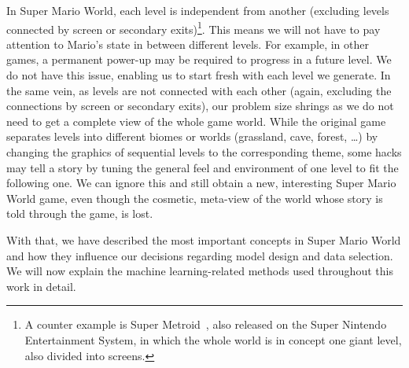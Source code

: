 In Super Mario World, each level is independent from another
(excluding levels connected by screen or secondary exits)\footnote{A
  counter example is Super Metroid~\cite{SuperMetroid2019}, also
  released on the Super Nintendo Entertainment System, in which the
  whole world is in concept one giant level, also divided into
  screens.}. This means we will not have to pay attention to Mario's
state in between different levels. For example, in other games, a
permanent power-up may be required to progress in a future level. We
do not have this issue, enabling us to start fresh with each level we
generate. In the same vein, as levels are not connected with each
other (again, excluding the connections by screen or secondary exits),
our problem size shrings as we do not need to get a complete view of
the whole game world. While the original game separates levels into
different biomes or worlds (grassland, cave, forest, \dots) by
changing the graphics of sequential levels to the corresponding theme,
some hacks may tell a story by tuning the general feel and environment
of one level to fit the following one. We can ignore this and still
obtain a new, interesting Super Mario World game, even though the
cosmetic, meta-view of the world whose story is told through the game,
is lost.

With that, we have described the most important concepts in Super
Mario World and how they influence our decisions regarding model
design and data selection. We will now explain the machine
learning-related methods used throughout this work in detail.


